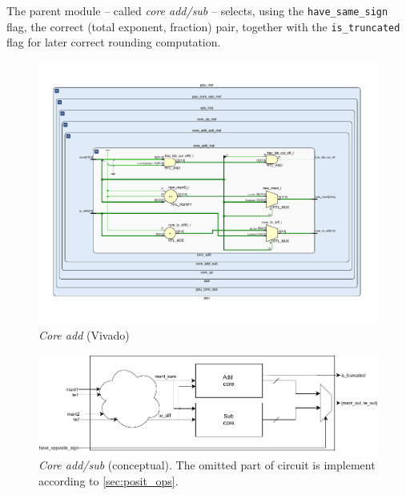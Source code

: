 The parent module -- called \textit{core add/sub} -- selects, using the \texttt{have\_same\_sign} flag, the correct (total exponent, fraction) pair, together with the \texttt{is\_truncated} flag for later correct rounding computation.

\begin{figure}
    \centering
    \includegraphics[width=\textwidth]{figures/core_add_vivado.pdf}
    \caption{\textit{Core add} (Vivado)}
    \label{fig:core_add_vivado}
\end{figure}%
\begin{figure}
    \centering
    \includegraphics[width=\textwidth]{figures/add-sub-core.drawio.pdf}
    \caption{\textit{Core add/sub} (conceptual). The omitted part of circuit is implement according to \ref{sec:posit_ops}.}
    \label{fig:core_add_sub_schematic_conc}
\end{figure}%

